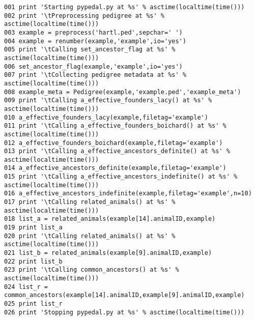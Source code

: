 \begin{verbatim}
001 print 'Starting pypedal.py at %s' % asctime(localtime(time()))
002 print '\tPreprocessing pedigree at %s' % asctime(localtime(time()))
003 example = preprocess('hartl.ped',sepchar=' ')
004 example = renumber(example,'example',io='yes')
005 print '\tCalling set_ancestor_flag at %s' % asctime(localtime(time()))
006 set_ancestor_flag(example,'example',io='yes')
007 print '\tCollecting pedigree metadata at %s' % asctime(localtime(time()))
008 example_meta = Pedigree(example,'example.ped','example_meta')
009 print '\tCalling a_effective_founders_lacy() at %s' % asctime(localtime(time()))
010 a_effective_founders_lacy(example,filetag='example')
011 print '\tCalling a_effective_founders_boichard() at %s' % asctime(localtime(time()))
012 a_effective_founders_boichard(example,filetag='example')
013 print '\tCalling a_effective_ancestors_definite() at %s' % asctime(localtime(time()))
014 a_effective_ancestors_definite(example,filetag='example')
015 print '\tCalling a_effective_ancestors_indefinite() at %s' % asctime(localtime(time()))
016 a_effective_ancestors_indefinite(example,filetag='example',n=10)
017 print '\tCalling related_animals() at %s' % asctime(localtime(time()))
018 list_a = related_animals(example[14].animalID,example)
019 print list_a
020 print '\tCalling related_animals() at %s' % asctime(localtime(time()))
021 list_b = related_animals(example[9].animalID,example)
022 print list_b
023 print '\tCalling common_ancestors() at %s' % asctime(localtime(time()))
024 list_r = common_ancestors(example[14].animalID,example[9].animalID,example)
025 print list_r
026 print 'Stopping pypedal.py at %s' % asctime(localtime(time()))
\end{verbatim}

